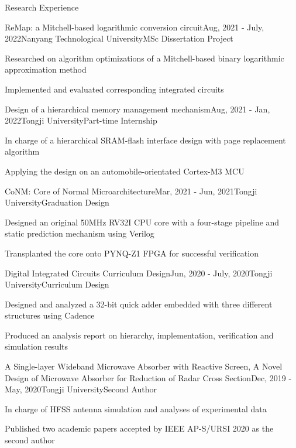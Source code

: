\documentclass{resume} %
\begin{document}
\begin{rSection}{Research Experience}
	
	\begin{rSubsection}{ReMap: a Mitchell-based logarithmic conversion circuit}{Aug, 2021 - July, 2022}{Nanyang Technological University}{MSc Dissertation Project}
		\item Researched on algorithm optimizations of a Mitchell-based binary logarithmic approximation method
		\item Implemented and evaluated corresponding integrated circuits
	\end{rSubsection}

	\begin{rSubsection}{Design of a hierarchical memory management mechanism}{Aug, 2021 - Jan, 2022}{Tongji University}{Part-time Internship}
		\item In charge of a hierarchical SRAM-flash interface design with page replacement algorithm
		\item Applying the design on an automobile-orientated Cortex-M3 MCU
	\end{rSubsection}
	
	\begin{rSubsection}{CoNM: Core of Normal Microarchitecture}{Mar, 2021 - Jun, 2021}{Tongji University}{Graduation Design}
		\item Designed an original 50MHz RV32I CPU core with a four-stage pipeline and static prediction mechanism using Verilog
		\item Transplanted the core onto PYNQ-Z1 FPGA for successful verification
	\end{rSubsection}

	\begin{rSubsection}{Digital Integrated Circuits Curriculum Design}{Jun, 2020 - July, 2020}{Tongji University}{Curriculum Design}
		\item Designed and analyzed a 32-bit quick adder embedded with three different structures using Cadence
		\item Produced an analysis report on hierarchy, implementation, verification and simulation results 
	\end{rSubsection}

	\begin{rSubsection}{A Single-layer Wideband Microwave Absorber with Reactive Screen, A Novel Design of Microwave Absorber for Reduction of Radar Cross Section}{Dec, 2019 - May, 2020}{Tongji University}{Second Author}
		\item In charge of HFSS antenna simulation and analyses of experimental data
		\item Published two academic papers accepted by IEEE AP-S/URSI 2020 as the second author
	\end{rSubsection}

\end{rSection}
\end{document}
